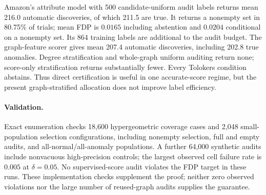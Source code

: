 \begin{table}[t]
\centering\scriptsize
\caption{Mean true discoveries among unreviewed nodes. All 100- and 250-label cells for score strata, score-plus-degree strata, and graph-uniform auditing are zero. Means include abstention; audited anomalies are excluded. Each entry averages ten trained scorers and 200 audits per scorer.}
\label{tab:certificate}
\end{table}

Amazon's attribute model with 500 candidate-uniform audit labels returns mean 216.0 automatic discoveries, of which 211.5 are true. It returns a nonempty set in 80.75\% of trials; mean FDP is $0.0165$ including abstention and $0.0204$ conditional on a nonempty set. Its 864 training labels are additional to the audit budget. The graph-feature scorer gives mean 207.4 automatic discoveries, including 202.8 true anomalies. Degree stratification and whole-graph uniform auditing return none; score-only stratification returns substantially fewer. Every Tolokers condition abstains. Thus direct certification is useful in one accurate-score regime, but the present graph-stratified allocation does not improve label efficiency.

\paragraph{Validation.}
Exact enumeration checks 18,600 hypergeometric coverage cases and 2,048 small-population selection configurations, including nonempty selection, full and empty audits, and all-normal/all-anomaly populations. A further 64,000 synthetic audits include nonvacuous high-precision controls; the largest observed cell failure rate is $0.005$ at $\delta=0.05$. No supervised-score audit violates the FDP target in these runs. These implementation checks supplement the proof; neither zero observed violations nor the large number of reused-graph audits supplies the guarantee.
